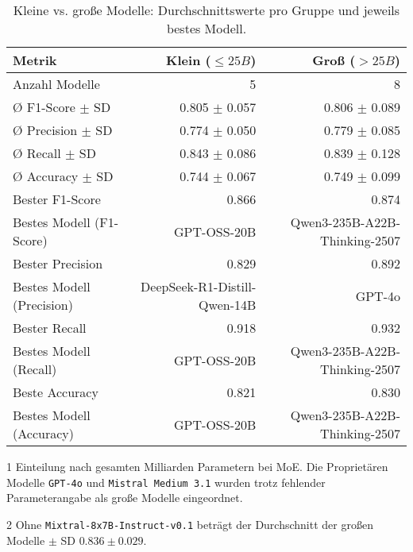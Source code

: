 \begin{table}[htbp]
 \centering
 \caption{Kleine vs. große Modelle: Durchschnittswerte pro Gruppe und jeweils bestes Modell.}
 \label{tab:small-vs-large}
 \begin{adjustbox}{width=\textwidth}
  \begin{threeparttable}[width=\textwidth]
   \begin{tabular}[width=\textwidth]{l r r}
    \toprule
    \textbf{Metrik} & \textbf{Klein} ($\leq 25B$) & \textbf{Groß} ($> 25B$) \\
    \midrule
    Anzahl Modelle\tnote{1}             & 5                         & 8 \\
    Ø F1-Score $\pm$ SD\tnote{2}      & 0.805 $\pm$ 0.057                     & 0.806 $\pm$ 0.089 \\
    Ø Precision $\pm$ SD    & 0.774 $\pm$ 0.050                     & 0.779 $\pm$ 0.085 \\
    Ø Recall $\pm$ SD       & 0.843 $\pm$ 0.086                     & 0.839 $\pm$ 0.128 \\
    Ø Accuracy $\pm$ SD     & 0.744 $\pm$ 0.067                     & 0.749 $\pm$ 0.099 \\
    Bester F1-Score & 0.866                     & 0.874 \\
    Bestes Modell (F1-Score)   & GPT-OSS-20B               & Qwen3-235B-A22B-Thinking-2507 \\
    Bester Precision & 0.829                     & 0.892 \\
    Bestes Modell (Precision) & DeepSeek-R1-Distill-Qwen-14B        & GPT-4o \\
    Bester Recall & 0.918                     & 0.932 \\
    Bestes Modell (Recall)      & GPT-OSS-20B      & Qwen3-235B-A22B-Thinking-2507 \\
    Beste Accuracy & 0.821                     & 0.830 \\
    Bestes Modell (Accuracy)     & GPT-OSS-20B               & Qwen3-235B-A22B-Thinking-2507 \\
    \bottomrule
   \end{tabular}
   \begin{tablenotes}
    \footnotesize
    \item[1] Einteilung nach gesamten Milliarden Parametern bei \ac{MoE}. Die Proprietären Modelle \texttt{GPT-4o} und \texttt{Mistral Medium 3.1} wurden trotz fehlender Parameterangabe als große Modelle eingeordnet.
    \item[2] Ohne \texttt{Mixtral-8x7B-Instruct-v0.1} beträgt der Durchschnitt der großen Modelle $\pm$ SD $0.836 \pm 0.029$.
   \end{tablenotes}
  \end{threeparttable}
 \end{adjustbox}
\end{table}


